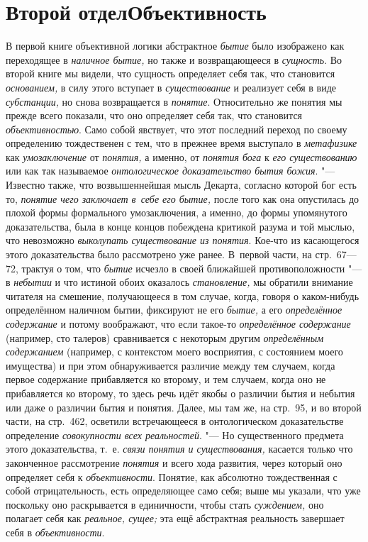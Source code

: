 \bigskip
\clearpage

\part[Второй отдел\newline ОБЪЕКТИВНОСТЬ]{Второй отдел\newline Объективность}

В первой книге объективной логики абстрактное {\em бытие} было
изображено как переходящее в {\em наличное бытие,} но
также и возвращающееся в {\em сущность}. Во второй
книге мы видели, что сущность определяет себя так, что становится
{\em основанием,} в силу этого вступает в {\em существование}
и реализует себя в виде {\em субстанции,} но
снова возвращается в {\em понятие}.
Относительно же понятия мы прежде всего показали, что оно
определяет себя так, что становится {\em объективностью}.
Само собой явствует, что этот последний переход по своему
определению тождественен с тем, что в прежнее время выступало в
{\em метафизике} как {\em умозаключение} от {\em понятия,} а именно,
от {\em понятия бога} к {\em его существованию} или как так называемое
{\em онтологическое доказательство бытия
божия}. "--- Известно также, что возвышеннейшая мысль Декарта,
согласно которой бог есть то, {\em понятие чего заключает в~себе его
бытие,} после того как она опустилась до плохой формы
формального умозаключения, а именно, до формы упомянутого доказательства,
была в конце концов побеждена критикой разума и той мыслью, что невозможно
{\em выколупать существование из
понятия}. Кое-что из касающегося этого доказательства было
рассмотрено уже ранее. В~первой части, на стр.~67---72, трактуя о том, что
{\em бытие} исчезло в своей ближайшей противоположности "--- в
{\em небытии} и что истиной обоих оказалось {\em становление,} мы
обратили внимание читателя на смешение, получающееся в том случае, когда,
говоря о каком-нибудь определённом наличном бытии, фиксируют не его
{\em бытие,} а его {\em определённое содержание}
и потому воображают, что если такое-то {\em определённое содержание}
(например, сто талеров) сравнивается с некоторым другим
{\em определённым содержанием}
(например, с контекстом моего восприятия, с состоянием моего
имущества) и при этом обнаруживается различие между тем случаем, когда
первое содержание прибавляется ко второму, и тем случаем, когда оно не
прибавляется ко второму, то здесь речь идёт якобы о различии бытия и
небытия или даже о различии бытия и понятия. Далее, мы там же, на стр.~95,
и во второй части, на стр.~462, осветили встречающееся в онтологическом
доказательстве определение {\em совокупности всех реальностей}. "---
Но существенного предмета этого доказательства, т.~е.
{\em связи понятия и существования,}
касается только что законченное рассмотрение {\em понятия} и всего
хода развития, через который оно определяет себя к {\em объективности}.
Понятие, как абсолютно тождественная с собой отрицательность,
есть определяющее само себя; выше мы указали, что уже поскольку оно
раскрывается в единичности, чтобы стать {\em суждением,} оно
полагает себя как {\em реальное, сущее;} эта ещё
абстрактная реальность завершает себя в {\em объективности}.

